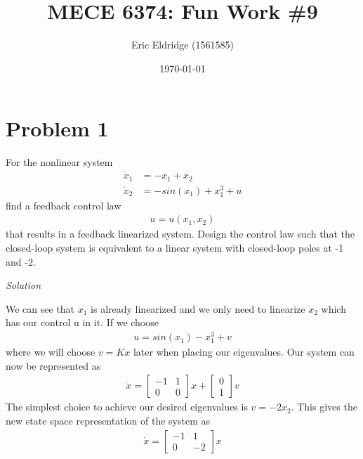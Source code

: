 \documentclass{article}
\title{MECE 6374: Fun Work \#9}
\date{\today}
\author{Eric Eldridge (1561585)}
\begin{document}

  \maketitle

  \section{Problem 1}

  For the nonlinear system
  \begin{align*}
    \dot{x}_1 &= -x_1 + x_2 \\
    \dot{x}_2 &= -sin(x_1) +x_1^3 + u
  \end{align*}
  find a feedback control law
  \begin{align*}
    u=u(x_1,x_2)
  \end{align*}
  that results in a feedback linearized system. Design the control law such that
  the closed-loop system is equivalent to a linear system with closed-loop poles
  at -1 and -2.
  \newline \newline

  \noindent \textit{Solution} \newline \newline

  We can see that $\dot{x}_1$ is already linearized and we only need to
  linearize $\dot{x}_2$ which has our control u in it. \newline
  If we choose
  \begin{align*}
    \nonumber u = sin(x_1) - x_1^3 + v
  \end{align*}
  where we will choose $v=Kx$ later when placing our eigenvalues. \newline
  Our system can now be represented as
  \begin{align*}
    \dot{x} = \begin{bmatrix}
      -1 & 1 \\
      0 & 0
    \end{bmatrix}x +
          \begin{bmatrix}
            0 \\
            1
          \end{bmatrix}v
  \end{align*}
  The simplest choice to achieve our desired eigenvalues is $v=-2x_2$. This
  gives the new state space representation of the system as
  \begin{align*}
    \dot{x} = \begin{bmatrix}
      -1 & 1 \\
      0 & -2
    \end{bmatrix}x 
  \end{align*}
\end{document}
